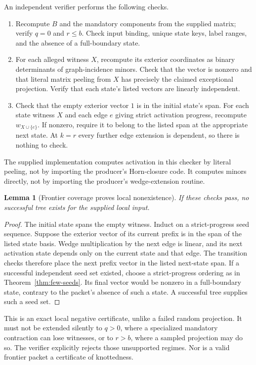 \documentclass[11pt,letterpaper]{article}
\newtheorem{lemma}[theorem]{Lemma}
\theoremstyle{definition}
\begin{document}
An independent verifier performs the following checks.
\begin{enumerate}
\item Recompute $B$ and the mandatory components from the supplied matrix;
verify $q=0$ and $r\leq b$. Check input binding, unique state keys, label
ranges, and the absence of a full-boundary state.
\item For each alleged witness $X$, recompute its exterior coordinates as
binary determinants of graph-incidence minors. Check that the vector is
nonzero and that literal matrix peeling from $X$ has precisely the claimed
exceptional projection. Verify that each state's listed vectors are
linearly independent.
\item Check that the empty exterior vector $1$ is in the initial state's
span. For each state witness $X$ and each edge $e$ giving strict activation
progress, recompute $w_{X\cup\{e\}}$. If nonzero, require it to belong
to the listed span at the appropriate next state. At $k=r$ every further
edge extension is dependent, so there is nothing to check.
\end{enumerate}
The supplied implementation computes activation in this checker by literal
peeling, not by importing the producer's Horn-closure code. It computes
minors directly, not by importing the producer's wedge-extension routine.

\begin{lemma}[Frontier coverage proves local nonexistence]\label{lem:frontier}
If these checks pass, no successful tree exists for the supplied local input.
\end{lemma}
\begin{proof}
The initial state spans the empty witness. Induct on a strict-progress seed
sequence. Suppose the exterior vector of its current prefix is in the span
of the listed state basis. Wedge multiplication by the next edge is linear,
and its next activation state depends only on the current state and that
edge. The transition checks therefore place the next prefix vector in the
listed next-state span. If a successful independent seed set existed, choose
a strict-progress ordering as in Theorem~\ref{thm:few-seeds}. Its final
vector would be nonzero in a full-boundary state, contrary to the packet's
absence of such a state. A successful tree supplies such a seed set.
\end{proof}

This is an exact local negative certificate, unlike a failed random
projection. It must not be extended silently to $q>0$, where a specialized
mandatory contraction can lose witnesses, or to $r>b$, where a sampled
projection may do so. The verifier explicitly rejects those unsupported
regimes. Nor is a valid frontier packet a certificate of knottedness.
\end{document}
